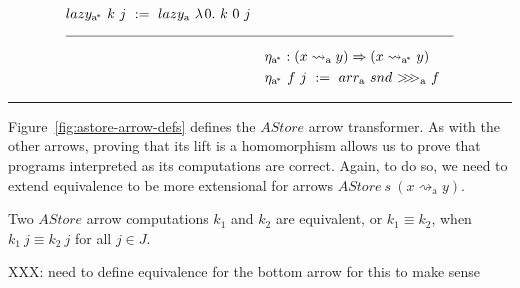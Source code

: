 \documentclass[preprint]{sigplanconf}
\newcommand{\arrow}{\rightsquigarrow}
\newcommand{\arrowarr}{\ensuremath{arr}}
\newcommand{\arrowcomp}{\ensuremath{{>}\mspace{-6mu}{>}\mspace{-6mu}{>}}}
\newcommand{\arrowlazy}{\ensuremath{lazy}}
\newcommand{\arrowtrans}{\ensuremath{\eta}}
\newcommand{\gen}{_\mathrm{a}}
\newcommand{\genc}{_\mathrm{a^{\mspace{-2mu}*}}}
\begin{document}
\begin{figure*}[t]
\begin{align*}
\begin{aligned}[t]
\begin{aligned}[t]
		&\arrowlazy\genc~k~j \ := \ \arrowlazy\gen~\fun{0}{k~0~j}
	\end{aligned} \\
\\[-6pt]
\hline
\\[-6pt]
	&\begin{aligned}[t]
		&\arrowtrans\genc : (x \arrow\gen y) \tto (x \arrow\genc y) \\
		&\arrowtrans\genc~f~j \ := \ \arrowarr\gen~snd~\arrowcomp\gen~f
	\end{aligned}
\end{aligned}
\end{align*}
\hrule
\caption{$AStore$ (associative store) arrow transformer definitions.}
\label{fig:astore-arrow-defs}
\end{figure*}

Figure~\ref{fig:astore-arrow-defs} defines the $AStore$ arrow transformer.
As with the other arrows, proving that its lift is a homomorphism allows us to prove that programs interpreted as its computations are correct.
Again, to do so, we need to extend equivalence to be more extensional for arrows $AStore~s~(x \arrow\gen y)$.

\begin{definition}
Two $AStore$ arrow computations $k_1$ and $k_2$ are equivalent, or $k_1 \equiv k_2$, when $k_1~j \equiv k_2~j$ for all $j \in J$.
\end{definition}

XXX: need to define equivalence for the bottom arrow for this to make sense
\end{document}
